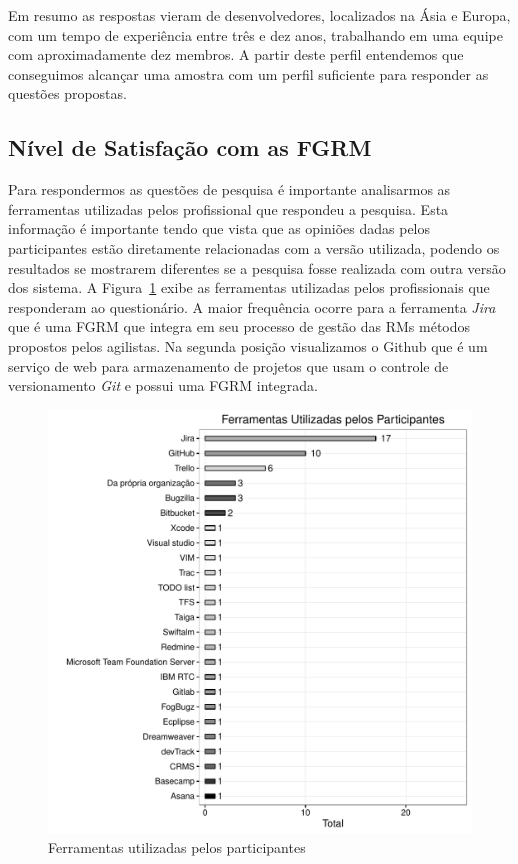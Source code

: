 Em resumo as respostas vieram de desenvolvedores, localizados na Ásia e Europa,
com um tempo de experiência entre três e dez anos, trabalhando em uma equipe com
aproximadamente dez membros. A partir deste perfil entendemos que conseguimos
alcançar uma amostra com um perfil suficiente para responder as questões
propostas.

\subsection{Nível de Satisfação com as FGRM}
\label{sub:nivel_de_satisfação_com_as_fgrm}

Para respondermos as questões de pesquisa é importante analisarmos as
ferramentas utilizadas pelos profissional que respondeu a pesquisa. Esta
informação é importante tendo que vista que as opiniões dadas pelos
participantes estão diretamente relacionadas com a versão utilizada, podendo os
resultados se mostrarem diferentes se a pesquisa fosse realizada com outra
versão dos sistema.  A
Figura~\ref{fig:grafico_melhorias_fgrm_ferramentas_utilizadas} exibe as
ferramentas utilizadas pelos profissionais que responderam ao questionário. A
maior frequência ocorre para a ferramenta \textit{Jira} que é uma FGRM que
integra em seu processo de gestão das RMs métodos propostos pelos agilistas. Na
segunda posição visualizamos o Github que é um serviço de web para armazenamento
de projetos que usam o controle de versionamento \textit{Git} e possui uma FGRM
integrada.

\begin{figure}[htpb]
	\centering
	\includegraphics[width=0.8\linewidth]{./chapter-pesquisa-com-profissionais/img/grafico_melhorias_fgrm_ferramentas_utilizadas.pdf}
	\caption{Ferramentas utilizadas pelos participantes}
\label{fig:grafico_melhorias_fgrm_ferramentas_utilizadas}
\end{figure}

